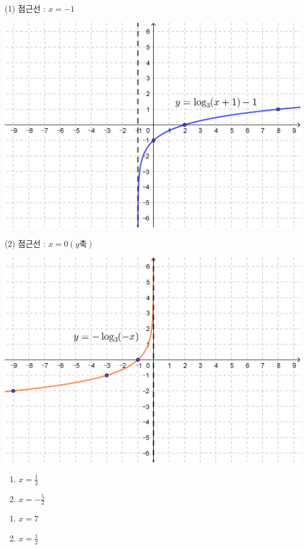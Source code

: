 \documentclass{oblivoir}
\begin{document}
\begin{multicols*}{2}
%
(1) 점근선 : \(x=-1\)
\begin{center}
\includegraphics[width=\columnwidth]{log_6-1}
\end{center}
\par\noindent
(2) 점근선 : \(x=0(y축)\)
\begin{center}
\includegraphics[width=\columnwidth]{log_6-2}
\end{center}

%
\begin{enumerate}
\item
\(x=\frac12\)
\item
\(x=-\frac52\)
\end{enumerate}

%
\begin{enumerate}
\item
\(x=7\)
\item
\(x=\frac12\)
\end{enumerate}


\end{multicols*}
\end{document}
